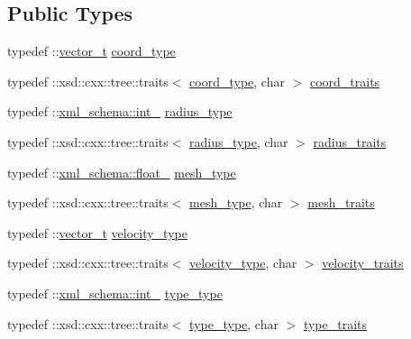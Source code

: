 \subsection*{Public Types}
\begin{DoxyCompactItemize}
\item 
typedef \+::\hyperlink{classvector__t}{vector\+\_\+t} \hyperlink{classsphere__t_a60b541b054e6695017e6468b51a89efd}{coord\+\_\+type}
\item 
typedef \+::xsd\+::cxx\+::tree\+::traits$<$ \hyperlink{classsphere__t_a60b541b054e6695017e6468b51a89efd}{coord\+\_\+type}, char $>$ \hyperlink{classsphere__t_a87077ccc12086ff4174bcce04de71df7}{coord\+\_\+traits}
\item 
typedef \+::\hyperlink{namespacexml__schema_acfa24ac68e1a188e7f44c36f7a158bf4}{xml\+\_\+schema\+::int\+\_\+} \hyperlink{classsphere__t_a7d5046bdba409d8f49e7c9902ae56278}{radius\+\_\+type}
\item 
typedef \+::xsd\+::cxx\+::tree\+::traits$<$ \hyperlink{classsphere__t_a7d5046bdba409d8f49e7c9902ae56278}{radius\+\_\+type}, char $>$ \hyperlink{classsphere__t_aa2048e5e8155003a2716f8a6e5bd9dea}{radius\+\_\+traits}
\item 
typedef \+::\hyperlink{namespacexml__schema_ad7e04ab17bba0b3fdde43fb79ef6ed87}{xml\+\_\+schema\+::float\+\_\+} \hyperlink{classsphere__t_af7cb7f854954b484b72bbed0516e223a}{mesh\+\_\+type}
\item 
typedef \+::xsd\+::cxx\+::tree\+::traits$<$ \hyperlink{classsphere__t_af7cb7f854954b484b72bbed0516e223a}{mesh\+\_\+type}, char $>$ \hyperlink{classsphere__t_ab459645510e9f8a3a0415beb6d1ce3cd}{mesh\+\_\+traits}
\item 
typedef \+::\hyperlink{classvector__t}{vector\+\_\+t} \hyperlink{classsphere__t_ad38aced876188b1732a5c050670f8cff}{velocity\+\_\+type}
\item 
typedef \+::xsd\+::cxx\+::tree\+::traits$<$ \hyperlink{classsphere__t_ad38aced876188b1732a5c050670f8cff}{velocity\+\_\+type}, char $>$ \hyperlink{classsphere__t_aebe9f6854dfafe65c376fd95c92fd87f}{velocity\+\_\+traits}
\item 
typedef \+::\hyperlink{namespacexml__schema_acfa24ac68e1a188e7f44c36f7a158bf4}{xml\+\_\+schema\+::int\+\_\+} \hyperlink{classsphere__t_a458644a173b4fcac645ccb6e0dd1605f}{type\+\_\+type}
\item 
typedef \+::xsd\+::cxx\+::tree\+::traits$<$ \hyperlink{classsphere__t_a458644a173b4fcac645ccb6e0dd1605f}{type\+\_\+type}, char $>$ \hyperlink{classsphere__t_ad0671f0626314f21b44379bb03b77cea}{type\+\_\+traits}
\end{DoxyCompactItemize}
